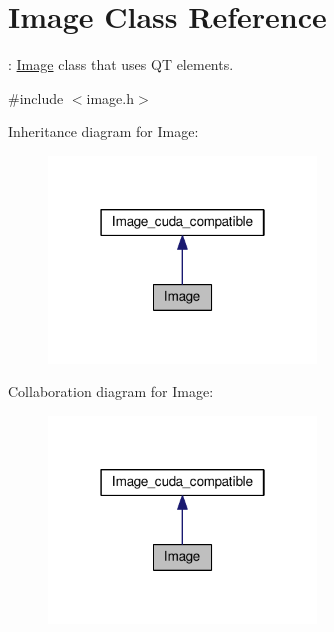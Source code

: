 \hypertarget{classImage}{}\section{Image Class Reference}
\label{classImage}


\+: \hyperlink{classImage}{Image} class that uses QT elements.  




{\ttfamily \#include $<$image.\+h$>$}



Inheritance diagram for Image\+:
\nopagebreak
\begin{figure}[H]
\begin{center}
\leavevmode
\includegraphics[width=202pt]{classImage__inherit__graph}
\end{center}
\end{figure}


Collaboration diagram for Image\+:
\nopagebreak
\begin{figure}[H]
\begin{center}
\leavevmode
\includegraphics[width=202pt]{classImage__coll__graph}
\end{center}
\end{figure}
